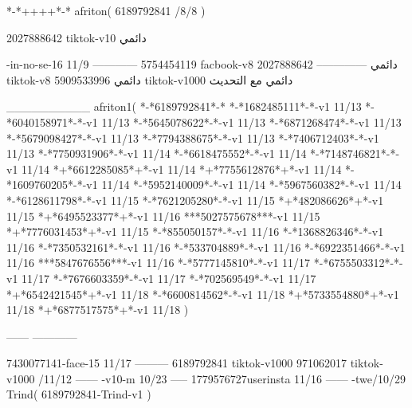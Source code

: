 *-*++++*-*
afriton(
6189792841 /8/8
)

2027888642 tiktok-v10
دائمي

-in-no-se-16 11/9
------------
5754454119 facbook-v8
دائمي
--------------
2027888642 tiktok-v8
دائمي
5909533996 tiktok-v1000
دائمي مع التحديث

__________
afriton1(
*-*6189792841*-*
*-*1682485111*-*-v1 11/13
*-*6040158971*-*-v1 11/13
*-*5645078622*-*-v1 11/13
*-*6871268474*-*-v1 11/13
*-*5679098427*-*-v1 11/13
*-*7794388675*-*-v1 11/13
*-*7406712403*-*-v1 11/13
*-*7750931906*-*-v1 11/14
*-*6618475552*-*-v1 11/14
*-*7148746821*-*-v1 11/14
*+*6612285085*+*-v1 11/14
*+*7755612876*+*-v1 11/14
*-*1609760205*-*-v1 11/14
*-*5952140009*-*-v1 11/14
*-*5967560382*-*-v1 11/14
*-*6128611798*-*-v1 11/15
*-*7621205280*-*-v1 11/15
*+*482086626*+*-v1 11/15
*+*6495523377*+*-v1 11/16
***5027575678***-v1 11/15
*+*7776031453*+*-v1 11/15
*-*855050157*-*-v1 11/16
*-*1368826346*-*-v1 11/16
*-*7350532161*-*-v1 11/16
*-*533704889*-*-v1 11/16
*-*6922351466*-*-v1 11/16
***5847676556***-v1 11/16
*-*5777145810*-*-v1 11/17
*-*6755503312*-*-v1 11/17
*-*7676603359*-*-v1 11/17
*-*702569549*-*-v1 11/17
*+*6542421545*+*-v1 11/18
*-*6600814562*-*-v1 11/18
*+*5733554880*+*-v1 11/18
*+*6877517575*+*-v1 11/18
)

------
------------

7430077141-face-15 11/17
---------
6189792841 tiktok-v1000
971062017 tiktok-v1000 /11/12
------
-v10-m 10/23
-----
1779576727userinsta 11/16
------
-twe/10/29
Trind(
6189792841-Trind-v1 
)
